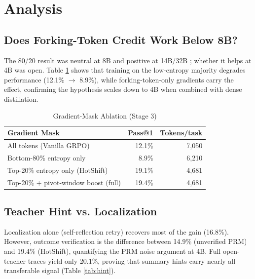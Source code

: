 \documentclass[conference]{IEEEtran}
\begin{document}
\section{Analysis}
\label{sec:analysis}

\subsection{Does Forking-Token Credit Work Below 8B?}
The 80/20 result was neutral at 8B and positive at 14B/32B \cite{wang2025}; whether it helps at 4B was open. Table \ref{tab:ablation} shows that training on the low-entropy majority degrades performance (12.1\% $\to$ 8.9\%), while forking-token-only gradients carry the effect, confirming the hypothesis scales down to 4B when combined with dense distillation.

\begin{table}[htbp]
\caption{Gradient-Mask Ablation (Stage 3)}
\centering
\begin{tabular}{@{}lrr@{}}
\toprule
\textbf{Gradient Mask} & \textbf{Pass@1} & \textbf{Tokens/task} \\
\midrule
All tokens (Vanilla GRPO) & 12.1\% & 7,050 \\
Bottom-80\% entropy only & 8.9\% & 6,210 \\
Top-20\% entropy only (HotShift) & 19.1\% & 4,681 \\
Top-20\% + pivot-window boost (full) & 19.4\% & 4,681 \\
\bottomrule
\end{tabular}
\label{tab:ablation}
\end{table}

\subsection{Teacher Hint vs. Localization}
Localization alone (self-reflection retry) recovers most of the gain (16.8\%). However, outcome verification is the difference between 14.9\% (unverified PRM) and 19.4\% (HotShift), quantifying the PRM noise argument \cite{cso} at 4B. Full open-teacher traces yield only 20.1\%, proving that summary hints carry nearly all transferable signal (Table \ref{tab:hint}).
\end{document}
